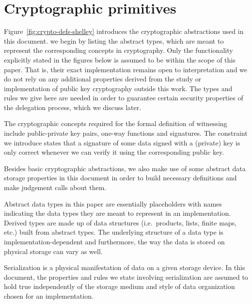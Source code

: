 \section{Cryptographic primitives}
\label{sec:crypto-primitives-shelley}

Figure~\ref{fig:crypto-defs-shelley} introduces the cryptographic abstractions used in
this document. we begin by listing the abstract types, which are meant to
represent the corresponding concepts in cryptography. Only the functionality
explicitly stated in the figures below is assumed to be within the scope of this paper.
That is, their exact
implementation remains open to interpretation and we do not rely on
any additional properties derived from the study or implementation of public key
cryptography outside this work. The types and rules we give here are needed in
order to guarantee certain security properties of the delegation process, which
we discuss later.

The cryptographic concepts required for the formal definition
of witnessing include public-private key pairs, one-way functions
and signatures. The constraint we introduce states that a signature of
some data signed with a (private) key is only correct whenever we can verify
it using the corresponding public key.

Besides basic cryptographic abstractions, we also make use of some abstract
data storage properties in this document in order to build necessary definitions
and make judgement calls about them.

Abstract data types in this paper are essentially placeholders with names
indicating the data types they are meant to represent in an implementation.
Derived types are made up of data structures (i.e.~products, lists, finite
maps, etc.) built from abstract types. The underlying structure of a data type
is implementation-dependent and furthermore, the way the data is stored on
physical storage can vary as well.

Serialization is a physical manifestation of data on a given storage device.
In this document, the properties and rules we state involving serialization are
assumed to hold true independently of the storage medium and style of data
organization chosen for an implementation.


